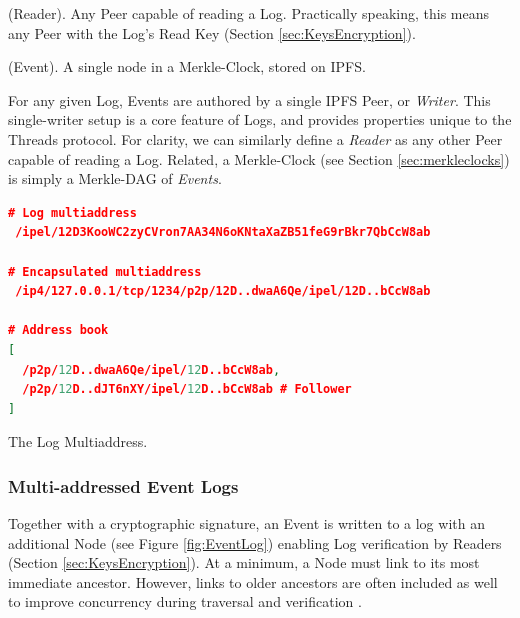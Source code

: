 \documentclass{textile}
\begin{document}
\begin{definition}
(Reader). Any Peer capable of reading a Log. Practically speaking, this means any Peer with the Log's Read Key (Section  \ref{sec:KeysEncryption}).
\end{definition}

\begin{definition}
 (Event). A single node in a Merkle-Clock, stored on IPFS.
\end{definition}

For any given Log, Events are authored by a single IPFS Peer, or \emph{Writer}. This single-writer setup is a core feature of Logs, and provides properties unique to the Threads protocol. For clarity, we can similarly define a \emph{Reader} as any other Peer capable of reading a Log. Related, a Merkle-Clock (see Section \ref{sec:merkleclocks}) is simply a Merkle-DAG of \emph{Events}.

\FloatBarrier

\begin{example*}[!b]
\centering
\begin{minipage}{0.7\textwidth}
\begin{lstlisting}[language=json,firstnumber=1]
# Log multiaddress
 /ipel/12D3KooWC2zyCVron7AA34N6oKNtaXaZB51feG9rBkr7QbCcW8ab

# Encapsulated multiaddress
 /ip4/127.0.0.1/tcp/1234/p2p/12D..dwaA6Qe/ipel/12D..bCcW8ab

# Address book
[
  /p2p/12D..dwaA6Qe/ipel/12D..bCcW8ab,
  /p2p/12D..dJT6nXY/ipel/12D..bCcW8ab # Follower
]
\end{lstlisting}
\end{minipage}
  \caption{The Log Multiaddress.}
  \label{ex:Multiaddress}
\end{example*}

\subsubsection{Multi-addressed Event Logs}

Together with a cryptographic signature, an Event is written to a log with an additional Node (see Figure \ref{fig:EventLog}) enabling Log verification by Readers (Section \ref{sec:KeysEncryption}). At a minimum, a Node must link to its most immediate ancestor. However, links to older ancestors are often included as well to improve concurrency during traversal and verification \cite{meyerBamboo2019}.
\end{document}
